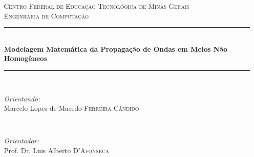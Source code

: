 \begin{titlepage}

\newcommand{\HRule}{\rule{\linewidth}{0.5mm}} %

\center %
 

\textsc{\LARGE Centro Federal de Educação Tecnológica de Minas Gerais}\\[3.5cm] %
\textsc{\Large Engenharia de Computação}\\[3.5cm] %


\HRule \\[0.4cm]
{ \huge \bfseries Modelagem Matemática da Propagação de Ondas em Meios Não Homogêneos}\\[0.4cm] %
\HRule \\[2.5cm]
 

\begin{minipage}{0.4\textwidth}
\begin{flushleft} \large
\emph{Orientando:}\\ Marcelo Lopes de Macedo \textsc{Ferreira Cândido} %
\end{flushleft}
\end{minipage}
~
\begin{minipage}{0.4\textwidth}
\begin{flushright} \large
\emph{Orientador:} \\
Prof. Dr. Luis Alberto \textsc{D'Afonseca} %
\end{flushright}
\end{minipage}\\[7cm]



\end{titlepage}
